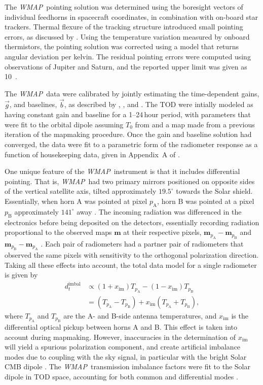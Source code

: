 \documentclass[twocolumn]{../../common/aa}
\def\WMAP{\emph{WMAP}}
\newcommand{\A}[0]{\mathrm{A}}
\newcommand{\B}[0]{\mathrm{B}}
\newcommand{\bv}[0]{\vec{b}}
\newcommand{\g}[0]{\vec{g}}
\begin{document}
The \WMAP\ pointing solution was determined using the boresight vectors of individual feedhorns in spacecraft coordinates, in combination with on-board star trackers. Thermal flexure of the tracking structure introduced small pointing errors, as discussed by \citet{jarosik2007}. Using the temperature variation measured by onboard thermistors, the pointing solution was corrected using a model that returns angular deviation per kelvin. The residual pointing errors were computed using observations of Jupiter and Saturn, and the reported upper limit was given as 10\arcsec\ \citep{bennett2012,wmapexsupp}.

The \WMAP\ data were calibrated by jointly estimating the time-dependent gains, $\g$, and baselines, $\bv$, as described by \citet{hinshaw2007}, \citet{hinshaw2009}, and \citet{jarosik2010}.
The TOD were intially modeled as having
constant gain and baseline for a 1--24\,hour period, with parameters that were fit to the orbital
dipole assuming $T_0$ from \citet{mather:1999} and a map made from a previous
iteration of the mapmaking procedure. Once the gain and baseline solution had
converged, the data were fit to a parametric form of the radiometer response
as a function of housekeeping data, given in Appendix~A of \citet{wmapexsupp}.

One unique feature of the \WMAP\ instrument is that it includes differential pointing. That is, \WMAP\ had two primary mirrors positioned on opposite sides of the vertical satellite axis, tilted approximately $19.5^\circ$ towards the Solar shield. Essentially, when horn A was pointed at pixel $p_\A$, horn B was pointed at a pixel $p_\B$ approximately $141^\circ$ away \citep{page2003:MAP}. The incoming radiation was differenced in the electronics before being deposited on the detectors, essentially recording radiation proportional to the observed maps $\boldsymbol m$ at their respective pixels, $\boldsymbol m_{p_\A}-\boldsymbol m_{p_\B}$ and $\boldsymbol m_{p_\B}-\boldsymbol m_{p_\A}$ \citep{jarosik2003:MAP}. Each pair of radiometers had a partner pair of radiometers that observed the same pixels with sensitivity to the orthogonal polarization direction. Taking all these effects into account, the total data model for a single radiometer is given by
\begin{align}
	d_t^\mathrm{imbal}&\propto (1+x_\mathrm{im})T_{p_\A}-(1-x_\mathrm{im})T_{p_\B}
	\\
	&=(T_{p_\A}-T_{p_\B})+x_\mathrm{im}(T_{p_\A}+T_{p_\B}),
\end{align}
where $T_{p_\A}$ and $T_{p_\B}$ are the A- and B-side antenna temperatures, and $x_\mathrm{im}$ is the differential optical pickup between horns A and B. This effect is taken into account during mapmaking. However, inaccuracies in the determination of $x_\mathrm{im}$ will yield a spurious polarization component, and create artificial imbalance modes due to coupling with the sky signal, in particular with the bright Solar CMB dipole \citep{jarosik2007}. The \WMAP\ transmission imbalance factors were fit to the Solar dipole in TOD space, accounting for both common and differential modes \citep{jarosik2003a,jarosik2007}.
\end{document}
